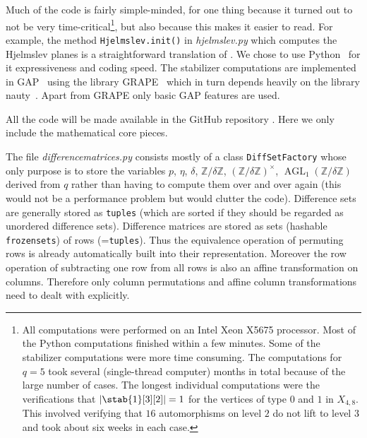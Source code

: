 \documentclass[a4paper,11pt]{amsart}
\numberwithin{equation}{section}
\theoremstyle{plain}
\theoremstyle{definition}
\theoremstyle{remark}
\newcommand{\Z}{\mathbb{Z}}
\newcommand{\abs}[1]{\lvert #1 \rvert}
\newcommand{\Aff}{\operatorname{AGL}}
\numberwithin{equation}{section}
\begin{document}
Much of the code is fairly simple-minded, for one thing because it turned out to not be very time-critical\footnote{All computations were performed on an Intel Xeon X5675 processor. Most of the Python computations finished within a few minutes. Some of the stabilizer computations were more time consuming. The computations for $q = 5$ took several (single-thread computer) months in total because of the large number of cases. The longest individual computations were the verifications that $\abs{\stab{1}[3][2]} = 1$ for the vertices of type $0$ and $1$ in $X_{4,8}$. This involved verifying that $16$ automorphisms on level $2$ do not lift to level $3$ and took about six weeks in each case.}, but also because this makes it easier to read. For example, the method \verb|Hjelmslev.init()| in \emph{hjelmslev.py} which computes the Hjelmslev planes is a straightforward translation of \cite[Corollary~9.7]{witzel}. We chose to use Python~\cite{python} for it expressiveness and coding speed. The stabilizer computations are implemented in GAP~\cite{gap} using the library GRAPE~\cite{grape} which in turn depends heavily on the library nauty~\cite{nauty}. Apart from GRAPE only basic GAP features are used.

All the code will be made available in the GitHub repository \cite{github_sl}. Here we only include the mathematical core pieces.

The file \emph{difference\textunderscore matrices.py} consists mostly of a class \verb|DiffSetFactory| whose only purpose is to store the variables $p$, $\eta$, $\delta$, $\Z/\delta\Z$, $(\Z/\delta\Z)^\times$, $\Aff_1(\Z/\delta\Z)$ derived from $q$ rather than having to compute them over and over again (this would not be a performance problem but would clutter the code). Difference sets are generally stored as \verb|tuples| (which are sorted if they should be regarded as unordered difference sets). Difference matrices are stored as sets (hashable \verb|frozensets|) of rows (=\verb|tuples|). Thus the equivalence operation of permuting rows is already automatically built into their representation. Moreover the row operation of subtracting one row from all rows is also an affine transformation on columns. Therefore only column permutations and affine column transformations need to dealt with explicitly.
\end{document}

